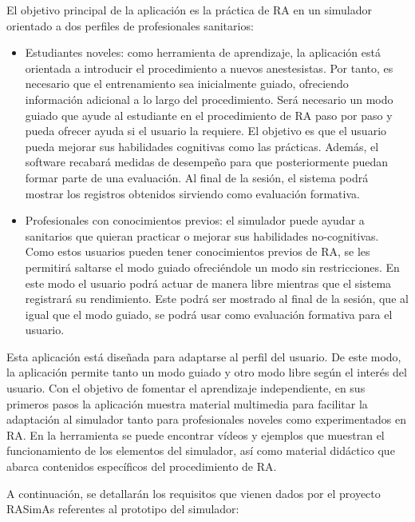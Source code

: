 El objetivo principal de la aplicación es la práctica de \ac{RA} en un simulador orientado a dos perfiles de profesionales sanitarios:
\begin{itemize}
    \item Estudiantes noveles: como herramienta de aprendizaje, la aplicación está orientada a introducir el procedimiento a nuevos anestesistas. Por tanto, es necesario que el entrenamiento sea inicialmente guiado, ofreciendo información adicional a lo largo del procedimiento. Será necesario un modo guiado que ayude al estudiante en el procedimiento de \ac{RA} paso por paso y pueda ofrecer ayuda si el usuario la requiere. El objetivo es que el usuario pueda mejorar sus habilidades cognitivas como las prácticas. Además, el software recabará medidas de desempeño para que posteriormente puedan formar parte de una evaluación. Al final de la sesión, el sistema podrá mostrar los registros obtenidos sirviendo como evaluación formativa.

\item Profesionales con conocimientos previos: el simulador puede ayudar a sanitarios que quieran practicar o mejorar sus habilidades no-cognitivas. Como estos usuarios pueden tener conocimientos previos de \ac{RA}, se les permitirá saltarse el modo guiado ofreciéndole un modo sin restricciones. En este modo el usuario podrá actuar de manera libre mientras que el sistema registrará su rendimiento. Este podrá ser mostrado al final de la sesión, que al igual que el modo guiado, se podrá usar como evaluación formativa para el usuario.

\end{itemize}


Esta aplicación está diseñada para adaptarse al perfil del usuario. De este modo, la aplicación permite tanto un modo guiado y otro modo libre según el interés del usuario. 
Con el objetivo de fomentar el aprendizaje independiente, en sus primeros pasos la aplicación muestra material multimedia para facilitar la adaptación al simulador tanto para profesionales noveles como experimentados en \ac{RA}. En la herramienta se puede encontrar vídeos y ejemplos que muestran el funcionamiento de los elementos del simulador, así como material didáctico que abarca contenidos específicos del procedimiento de \ac{RA}.



A continuación, se detallarán los requisitos que vienen dados por el proyecto \ac{RASimAs} referentes al prototipo del simulador:


